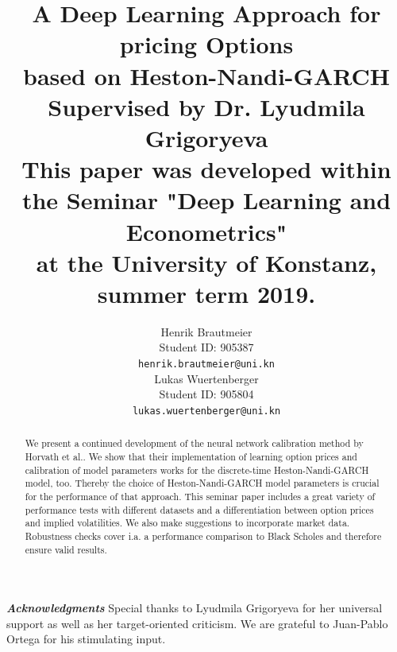 \documentclass{article}
\title{A Deep Learning Approach for pricing Options \\ based on Heston-Nandi-GARCH  \\ \vspace{.38cm} {\footnotesize Supervised by Dr. Lyudmila Grigoryeva \\ \vspace{.38cm} This paper was developed within the Seminar "Deep Learning and Econometrics" \\ at the University of Konstanz, summer term 2019.}}
\author{
  Henrik Brautmeier \\
  Student ID: 905387 \\
  \texttt{henrik.brautmeier@uni.kn} \\
  \And
 Lukas Wuertenberger \\
 Student ID: 905804 \\
 \texttt{lukas.wuertenberger@uni.kn} \\
}
\begin{document}
\maketitle
\begin{abstract}
We present a continued development of the neural network calibration method by Horvath et al.\cite{Blanka}. We show that their implementation of learning option prices and calibration of model parameters works for the  discrete-time Heston-Nandi-GARCH model, too. Thereby the choice of Heston-Nandi-GARCH model parameters is crucial for the performance of that approach. This seminar paper includes a great variety of performance tests with different datasets and a differentiation between option prices and implied volatilities. We also make suggestions to incorporate market data. Robustness checks cover i.a. a performance comparison to Black Scholes and therefore ensure valid results.
\end{abstract}


\textit{\textbf{Acknowledgments}} Special thanks to Lyudmila Grigoryeva for her universal support as well as her target-oriented criticism. We are grateful to Juan-Pablo Ortega for his stimulating input.

\newpage \tableofcontents\newpage
\end{document}
